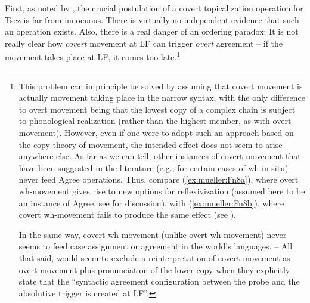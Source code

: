 \documentclass[output=paper
,modfonts
,nonflat]{langsci/langscibook}
\begin{document}
	First, as noted by \cite{Boskovic:07}, the crucial postulation of a
	covert topicalization operation for Tsez is far from innocuous. There
	is virtually no independent evidence that such an operation
	exists. Also, there is a real danger of an ordering paradox: It is not
	really clear how {\itshape covert} movement at LF can trigger {\itshape overt}
	agreement -- if the movement takes place at LF, it comes too
	late.\footnote{This problem  can in principle be solved by assuming
		that covert movement is actually movement taking place in the
		narrow syntax, with the only difference to overt movement being that
		the lowest copy of a complex chain is subject to phonological
		realization (rather than the highest member, as with overt movement).
		However, even if one were to adopt such an approach based on the copy
		theory of movement, the intended effect does not seem to arise
		anywhere else. As far as we can tell, other instances of covert
		movement that have been suggested in the literature (e.g., for certain
		cases of wh-in situ) never feed Agree operations. Thus, compare (\ref{ex:mueller:Fn8a}),
		where overt wh-movement gives rise to new options for reflexivization
		(assumed here to be an instance of Agree, see \citealt{Reuland:11} for
		discussion), with (\ref{ex:mueller:Fn8b}), where covert wh-movement fails to produce the
		same effect (see \citealt{Barss:86}). 
		
		\ea\label{ex:mueller:Fn8}
		\z
		\z
		In the same way, covert wh-movement (unlike overt wh-movement) never seems to feed case
		assignment or agreement in the world's languages. -- 
		All  that said, \citet[626]{PolinskyPotsdam:01} would seem to 
		exclude a reinterpretation of covert movement as overt movement plus
		pronunciation of the lower copy when they explicitly state that the
		``syntactic agreement configuration between the probe and the
		absolutive trigger is created at LF''.}
	
\end{document}
